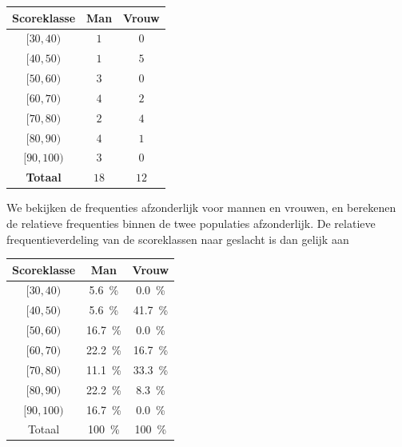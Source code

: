 \begin{enumerate}[label=(\alph*)]
{        \begin{center}
            \begin{tabular}{c|cc}
                \toprule
                    \textbf{Scoreklasse} & \textbf{Man} & \textbf{Vrouw} \\
                \midrule
                    $[30, 40)$ & $1$ & $0$ \\
                    $[40, 50)$ & $1$ & $5$ \\
                    $[50, 60)$ & $3$ & $0$ \\
                    $[60, 70)$ & $4$ & $2$ \\
                    $[70, 80)$ & $2$ & $4$ \\
                    $[80, 90)$ & $4$ & $1$ \\
                    $[90, 100)$ & $3$ & $0$ \\
                \midrule    
                    \textbf{Totaal} & $18$ & $12$ \\
                \bottomrule
            \end{tabular}
        \end{center}

        We bekijken de frequenties afzonderlijk voor mannen en vrouwen, en berekenen de relatieve frequenties binnen de twee populaties afzonderlijk.
        De relatieve frequentieverdeling van de scoreklassen naar geslacht is dan gelijk aan

        \begin{center}
            \begin{tabular}{c|cc}
                \toprule
                    \textbf{Scoreklasse} & \textbf{Man} & \textbf{Vrouw} \\
                \midrule
                    $[30, 40)$ & \SI{5.6}{\percent} & \SI{0.0}{\percent} \\
                    $[40, 50)$ & \SI{5.6}{\percent} & \SI{41.7}{\percent} \\
                    $[50, 60)$ & \SI{16.7}{\percent} & \SI{0.0}{\percent} \\
                    $[60, 70)$ & \SI{22.2}{\percent} & \SI{16.7}{\percent} \\
                    $[70, 80)$ & \SI{11.1}{\percent} & \SI{33.3}{\percent} \\
                    $[80, 90)$ & \SI{22.2}{\percent} & \SI{8.3}{\percent} \\
                    $[90, 100)$ & \SI{16.7}{\percent} & \SI{0.0}{\percent} \\
                \midrule    
                    Totaal & \SI{100}{\percent} & \SI{100}{\percent} \\
                \bottomrule
            \end{tabular}
        \end{center}
    }


\end{enumerate}
